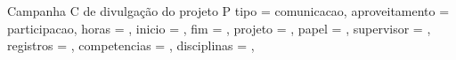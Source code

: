 \begin{atividade}{Campanha C de divulgação do projeto P}{
  tipo         = comunicacao,
  aproveitamento = participacao,   %
  horas        = {},   %
  inicio       = {},   %
  fim          = {},   %
  projeto      = {},
  papel        = {},   %
  supervisor   = {},   %
  registros    = {},   %
  competencias = {},   %
  disciplinas  = {},   %
}

\begin{contexto}
\end{contexto}

\begin{contribuicao}
\end{contribuicao}

\begin{desenvolvimento}



\end{desenvolvimento}
\end{atividade}
